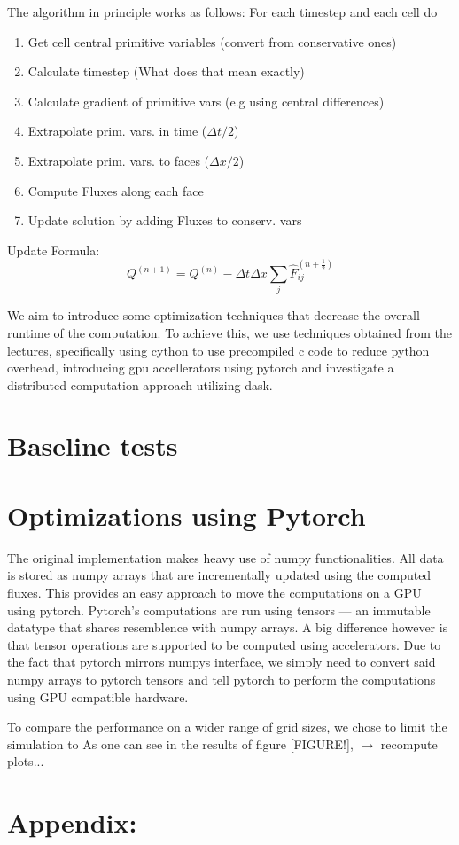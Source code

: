 \documentclass[a4paper,12pt]{article}
\begin{document}
The algorithm in principle works as follows:
For each timestep and each cell do
\begin{enumerate}
  \item Get cell central primitive variables (convert from conservative ones)
  \item Calculate timestep (What does that mean exactly)
  \item Calculate gradient of primitive vars (e.g using central differences)
  \item Extrapolate prim. vars. in time ($\Delta t / 2$)
  \item Extrapolate prim. vars. to faces ($\Delta x / 2$)
  \item Compute Fluxes along each face
  \item Update solution by adding Fluxes to conserv. vars
\end{enumerate}

Update Formula:
\begin{equation}
Q^{(n+1)} = Q^{(n)} - \Delta t \Delta x \sum_{j} \hat{F}_{ij}^{(n + \frac{1}{2})}
\end{equation}

We aim to introduce some optimization techniques that decrease the overall runtime of the computation.
To achieve this, we use techniques obtained from the lectures, specifically using cython to use precompiled c code to reduce python overhead,
introducing gpu accellerators using pytorch and investigate a distributed computation approach utilizing dask.

\section{Baseline tests}

\section{Optimizations using Pytorch}
The original implementation makes heavy use of numpy functionalities.
All data is stored as numpy arrays that are incrementally updated using the computed fluxes.
This provides an easy approach to move the computations on a GPU using pytorch.
Pytorch's computations are run using tensors --- an immutable datatype that shares resemblence with numpy arrays.
A big difference however is that tensor operations are supported to be computed using accelerators.
Due to the fact that pytorch mirrors numpys interface, we simply need to convert said numpy arrays to pytorch tensors
and tell pytorch to perform the computations using GPU compatible hardware.

To compare the performance on a wider range of grid sizes, we chose to limit the simulation to
As one can see in the results of figure [FIGURE!],
$\rightarrow$ recompute plots...

\section{Appendix:}


\end{document}
